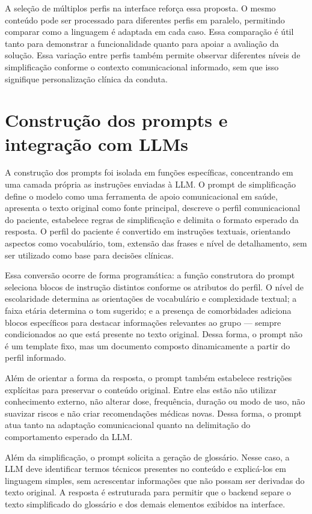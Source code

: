 A seleção de múltiplos perfis na interface reforça essa proposta. O mesmo conteúdo pode ser processado para diferentes perfis em paralelo, permitindo comparar como a linguagem é adaptada em cada caso. Essa comparação é útil tanto para demonstrar a funcionalidade quanto para apoiar a avaliação da solução. Essa variação entre perfis também permite observar diferentes níveis de simplificação conforme o contexto comunicacional informado, sem que isso signifique personalização clínica da conduta.

\section{Construção dos prompts e integração com LLMs}
\label{sec:construcao-prompts-integracao-llms}

A construção dos prompts foi isolada em funções específicas, concentrando em uma camada própria as instruções enviadas à LLM. O prompt de simplificação define o modelo como uma ferramenta de apoio comunicacional em saúde, apresenta o texto original como fonte principal, descreve o perfil comunicacional do paciente, estabelece regras de simplificação e delimita o formato esperado da resposta. O perfil do paciente é convertido em instruções textuais, orientando aspectos como vocabulário, tom, extensão das frases e nível de detalhamento, sem ser utilizado como base para decisões clínicas.

Essa conversão ocorre de forma programática: a função construtora do prompt seleciona blocos de instrução distintos conforme os atributos do perfil. O nível de escolaridade determina as orientações de vocabulário e complexidade textual; a faixa etária determina o tom sugerido; e a presença de comorbidades adiciona blocos específicos para destacar informações relevantes ao grupo — sempre condicionados ao que está presente no texto original. Dessa forma, o prompt não é um template fixo, mas um documento composto dinamicamente a partir do perfil informado.

Além de orientar a forma da resposta, o prompt também estabelece restrições explícitas para preservar o conteúdo original. Entre elas estão não utilizar conhecimento externo, não alterar dose, frequência, duração ou modo de uso, não suavizar riscos e não criar recomendações médicas novas. Dessa forma, o prompt atua tanto na adaptação comunicacional quanto na delimitação do comportamento esperado da LLM.

Além da simplificação, o prompt solicita a geração de glossário. Nesse caso, a LLM deve identificar termos técnicos presentes no conteúdo e explicá-los em linguagem simples, sem acrescentar informações que não possam ser derivadas do texto original. A resposta é estruturada para permitir que o backend separe o texto simplificado do glossário e dos demais elementos exibidos na interface.


